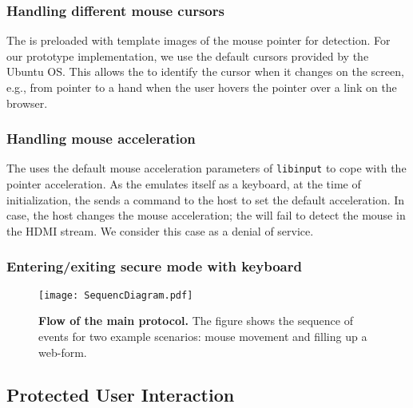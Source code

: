 \subsubsection{\bfseries Handling different mouse cursors} The \device is preloaded with template images of the mouse pointer for detection. For our \name prototype implementation, we use the default cursors provided by the Ubuntu OS. This allows the \device to identify the cursor when it changes on the screen, e.g., from pointer to a hand when the user hovers the pointer over a link on the browser. 

 
\subsubsection{\bfseries Handling mouse acceleration} The \device uses the default mouse acceleration parameters of \texttt{libinput} to cope with the pointer acceleration. As the \device emulates itself as a keyboard, at the time of initialization, the \device sends a command to the host to set the default acceleration. In case, the host changes the mouse acceleration; the \device will fail to detect the mouse in the HDMI stream. We consider this case as a denial of service.

\subsubsection{\bfseries Entering/exiting secure mode with keyboard} 

\begin{figure}[t]
\centering
\texttt{[image: SequencDiagram.pdf]}
\caption{\textbf{Flow of the \name main protocol.} The figure shows the sequence of events for two example scenarios: mouse movement and filling up a web-form.}
\spacesave
\label{fig:sequence}
\centering
\end{figure}


\subsection{Protected User Interaction}
\label{sec:systemDesign:commit}

